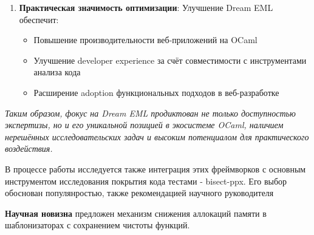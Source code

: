 \begin{enumerate}
    \item \textbf{Практическая значимость оптимизации}:
          Улучшение Dream EML обеспечит:
          \begin{itemize}
              \item Повышение производительности веб-приложений на OCaml
              \item Улучшение developer experience за счёт совместимости с инструментами анализа кода
              \item Расширение adoption функциональных подходов в веб-разработке
          \end{itemize}
\end{enumerate}

\textit{Таким образом, фокус на Dream EML продиктован не только доступностью экспертизы, но и его уникальной позицией в экосистеме OCaml, наличием нерешённых исследовательских задач и высоким потенциалом для практического воздействия.}

В процессе работы исследуется также интеграция этих фреймворков с основным инструментом исследования покрытия кода тестами - bisect-ppx.
Его выбор обоснован популянростью, также рекомендацией научного руководителя %


\textbf{Научная новизна} предложен механизм снижения аллокаций памяти в шаблонизаторах с сохранением чистоты функций.



